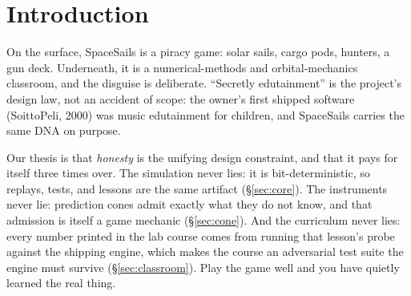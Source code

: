 \documentclass[10pt,twocolumn]{article}
\begin{document}
\renewcommand{\thefootnote}{\fnsymbol{footnote}}%
%
\renewcommand{\thefootnote}{\arabic{footnote}}%
\setcounter{footnote}{0}

\section{Introduction}

On the surface, SpaceSails is a piracy game: solar sails, cargo pods, hunters, a gun deck.
Underneath, it is a numerical-methods and orbital-mechanics classroom, and the disguise is
deliberate. ``Secretly edutainment'' is the project's design law, not an accident of scope:
the owner's first shipped software (SoittoPeli, 2000) was music edutainment for children,
and SpaceSails carries the same DNA on purpose.

Our thesis is that \emph{honesty} is the unifying design constraint, and that it pays for
itself three times over. The simulation never lies: it is bit-deterministic, so replays,
tests, and lessons are the same artifact (\S\ref{sec:core}). The instruments never lie:
prediction cones admit exactly what they do not know, and that admission is itself a game
mechanic (\S\ref{sec:cone}). And the curriculum never lies: every number printed in the lab
course comes from running that lesson's probe against the shipping engine, which makes the
course an adversarial test suite the engine must survive (\S\ref{sec:classroom}). Play the
game well and you have quietly learned the real thing.
\end{document}
